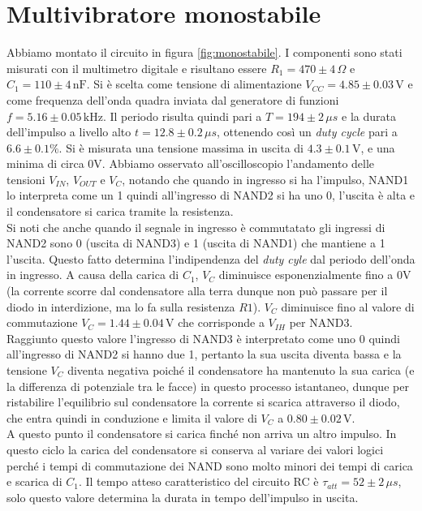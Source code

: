 \documentclass[10pt,a4paper]{article}
\begin{document}
\section{Multivibratore monostabile}
Abbiamo montato il circuito in figura \ref{fig:monostabile}. I componenti sono stati misurati con il multimetro digitale e risultano essere $R_1= 470\pm4\,\Omega$ e $C_1= 110\pm4 \,\text{nF} $. Si è scelta come tensione di alimentazione $V_{CC}= 4.85\pm0.03\,\text{V}$ e come frequenza dell'onda quadra inviata dal generatore di funzioni $f = 5.16\pm0.05\,\text{kHz}$. Il periodo risulta quindi pari a $T=194\pm2\,\mu s$ e la durata dell'impulso a livello alto $t=12.8\pm0.2\,\mu s$, ottenendo così un \emph{duty cycle} pari a $6.6\pm0.1\% $. Si è misurata una tensione massima in uscita di $4.3\pm0.1\,\text{V}$, e una minima di circa 0V. Abbiamo osservato all'oscilloscopio l'andamento delle tensioni $V_{IN}$, $V_{OUT}$ e $V_{C}$, notando che quando in ingresso si ha l'impulso, NAND1 lo interpreta come un 1 quindi all'ingresso di NAND2 si ha uno 0, l'uscita è alta e il condensatore si carica tramite la resistenza.\\
Si noti che anche quando il segnale in ingresso è commutatato gli ingressi di NAND2 sono 0 (uscita di NAND3) e 1 (uscita di NAND1) che mantiene a 1 l'uscita. Questo fatto determina l'indipendenza del \emph{duty cyle} dal periodo dell'onda in ingresso. A causa della carica di $C_1$, $V_C$ diminuisce esponenzialmente fino a $0$V (la corrente scorre dal condensatore  alla terra dunque non può passare per il diodo in interdizione, ma lo fa sulla resistenza $R1$). $V_C$ diminuisce fino al valore di commutazione $V_C=1.44\pm0.04\,\text{V}$ che corrisponde a $V_{IH}$ per NAND3.\\
 Raggiunto questo valore l'ingresso di NAND3 è interpretato come uno 0 quindi all'ingresso di NAND2 si hanno due 1, pertanto la sua uscita diventa bassa e la tensione $V_C$ diventa negativa poiché  il condensatore ha mantenuto la sua carica (e la differenza di potenziale tra le facce) in questo processo istantaneo, dunque per ristabilire l'equilibrio sul condensatore la corrente si scarica attraverso il diodo, che entra quindi in conduzione e limita il valore di $V_C$ a $0.80\pm0.02\,\text{V}$.\\
A questo punto il condensatore si carica finché non arriva un altro impulso. In questo ciclo la carica del condensatore si conserva al variare dei valori logici perché i tempi di commutazione dei NAND sono molto minori dei tempi di carica e scarica di $C_1$. Il tempo atteso caratteristico del circuito RC è $\tau_{att}=52\pm2\,\mu s$, solo questo valore determina la durata in tempo dell'impulso in uscita.\\
\end{document}
